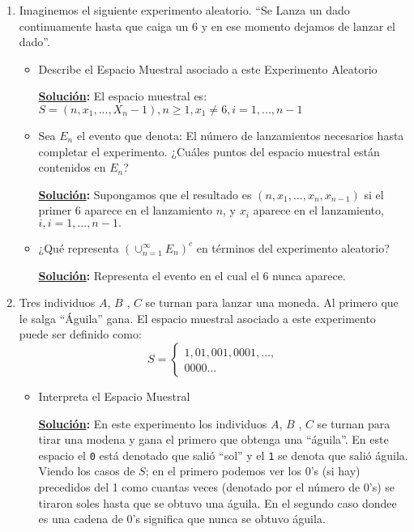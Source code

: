 \documentclass[11pt,letterpaper]{report}
\newcommand{\sol}{\textbf{\underline{Solución}: }} %
\begin{document}
\begin{enumerate}

\item Imaginemos el siguiente experimento aleatorio. ``Se Lanza un dado continuamente hasta que
caiga un 6 y en ese momento dejamos de lanzar el dado''.

\begin{itemize}
    \item Describe el Espacio Muestral asociado a este Experimento Aleatorio

    \sol El espacio muestral es: $S = (n,x_1,...,X_n-1), n \geq 1, x_1 \not= 6, i=1,...,n-1$ 

    \item Sea $E_n$ el evento que denota: El número de lanzamientos necesarios hasta completar el
    experimento. ¿Cuáles puntos del espacio muestral están contenidos en $E_n$?

    \sol Supongamos que el resultado es $(n,x_1,...,x_n,x_{n-1})$ si el primer 6 aparece en el
    lanzamiento $n$, y $x_i$ aparece en el lanzamiento, $i, i=1,...,n-1 .$

    \item ¿Qué representa $(\cup_{n=1}^{\infty} E_n)^c$ en términos del experimento aleatorio?

    \sol Representa el evento en el cual el 6 nunca aparece.    

\end{itemize}


\item Tres individuos $A$, $B$ , $C$ se turnan para lanzar una moneda. Al primero que le salga
``Águila'' gana. El espacio muestral asociado a este experimento puede ser definido como:
\[
    S =
    \begin{cases}
        1, 01, 001, 0001, \ldots,\\
        0000\ldots
    \end{cases}
\]

\begin{itemize}
    \item Interpreta el Espacio Muestral
    
    \sol En este experimento los individuos $A$, $B$ , $C$ se turnan para tirar una modena y gana
    el primero que obtenga una ``águila''. En este espacio el \texttt{0} está denotado que salió
    ``sol'' y el \texttt{1} se denota que salió águila. Viendo los casos de $S$; en el
    primero podemos ver los 0's (si hay) precedidos del 1 como cuantas veces (denotado por el
    número de 0's) se tiraron soles hasta que se obtuvo una águila. En el segundo caso dondee es
    una cadena de 0's significa que nunca se obtuvo águila.


\end{itemize}
\end{enumerate}
\end{document}

